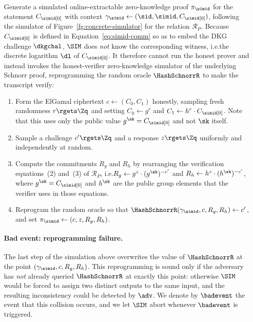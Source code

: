         \item Generate a simulated online-extractable zero-knowledge proof $\pi_\simid$ for the
          statement $C_\simid[0]$ with context $\gamma_\simid \gets (\sid, \simid, C_\simid[0])$,
          following the simulator of Figure~\ref{fg:concrete-simulator} for the relation $\mathcal{R}_P$.
          Because $C_\simid[0]$ is defined in Equation~\eqref{eq:simid-comm} so as to embed the DKG
          challenge $\dkgchal$, $\SIM$ does \emph{not} know the corresponding witness, i.e.\@ the
          discrete logarithm $\dl$ of $C_\simid[0]$. It therefore cannot run the honest prover and
          instead invokes the honest-verifier zero-knowledge simulator of the underlying Schnorr
          proof, reprogramming the random oracle $\HashSchnorrR$ to make the transcript verify:
          \begin{enumerate}
            \item Form the ElGamal ciphertext $c \gets (C_0, C_1)$ honestly, sampling fresh randomness
              $r \rgets \Zq$ and setting $C_0 \gets g^{r}$ and $C_1 \gets h^{r} \cdot C_\simid[0]$.
              Note that this uses only the public value $g^{\sk} = C_\simid[0]$ and not $\sk$ itself.
            \item Sample a challenge $c' \rgets \Zq$ and a response $z \rgets \Zq$ uniformly and
              independently at random.
            \item Compute the commitments $R_g$ and $R_h$ by rearranging the verification equations~(2)
              and~(3) of $\mathcal{R}_P$, i.e.\@ $R_g \gets g^{z} \cdot (g^{\sk})^{-c'}$ and
              $R_h \gets h^{z} \cdot (h^{\sk})^{-c'}$, where $g^{\sk} = C_\simid[0]$ and $h^{\sk}$ are
              the public group elements that the verifier uses in those equations.
            \item Reprogram the random oracle so that $\HashSchnorrR(\gamma_\simid, c, R_g, R_h) \gets c'$,
              and set $\pi_\simid \gets (c, z, R_g, R_h)$.
          \end{enumerate}



    \medskip

    \paragraph{\bf Bad event: reprogramming failure.}
    The last step of the simulation above overwrites the value of $\HashSchnorrR$ at the point
    $(\gamma_\simid, c, R_g, R_h)$. This reprogramming is sound only if the adversary has \emph{not}
    already queried $\HashSchnorrR$ at exactly this point: otherwise $\SIM$ would be forced to assign
    two distinct outputs to the same input, and the resulting inconsistency could be detected by
    $\adv$. We denote by $\badevent$ the event that this collision occurs, and we let $\SIM$ abort
    whenever $\badevent$ is triggered.

